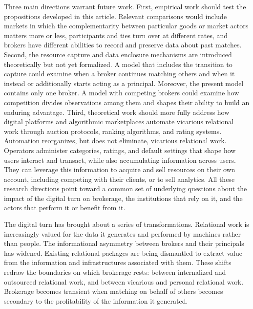 \documentclass[
]{article}
\begin{document}
Three main directions warrant future work. First, empirical work should test the propositions developed in this article. Relevant comparisons would include markets in which the complementarity between particular goods or market actors matters more or less, participants and ties turn over at different rates, and brokers have different abilities to record and preserve data about past matches. Second, the resource capture and data enclosure mechanisms are introduced theoretically but not yet formalized. A model that includes the transition to capture could examine when a broker continues matching others and when it instead or additionally starts acting as a principal. Moreover, the present model contains only one broker. A model with competing brokers could examine how competition divides observations among them and shapes their ability to build an enduring advantage. Third, theoretical work should more fully address how digital platforms and algorithmic marketplaces automate vicarious relational work through auction protocols, ranking algorithms, and rating systems. Automation reorganizes, but does not eliminate, vicarious relational work. Operators administer categories, ratings, and default settings that shape how users interact and transact, while also accumulating information across users. They can leverage this information to acquire and sell resources on their own account, including competing with their clients, or to sell analytics. All these research directions point toward a common set of underlying questions about the impact of the digital turn on brokerage, the institutions that rely on it, and the actors that perform it or benefit from it.

The digital turn has brought about a series of transformations. Relational work is increasingly valued for the data it generates and performed by machines rather than people. The informational asymmetry between brokers and their principals has widened. Existing relational packages are being dismantled to extract value from the information and infrastructures associated with them. These shifts redraw the boundaries on which brokerage rests: between internalized and outsourced relational work, and between vicarious and personal relational work. Brokerage becomes transient when matching on behalf of others becomes secondary to the profitability of the information it generated.

\nocite{borgattiStructuralHolesUnpacking1997,brandesFasterAlgorithmBetweenness2001,everettUnpackingBurtsConstraint2020,freemanSetMeasuresCentrality1977}
\printbibliography[heading=bibnumbered,title={References}]
\end{document}
